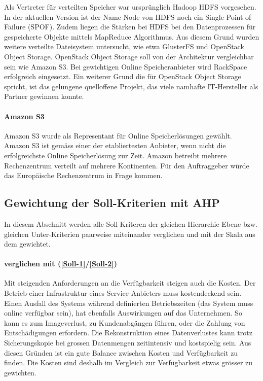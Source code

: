 Als Vertreter für verteilten Speicher war ursprünglich Hadoop HDFS vorgesehen. In der aktuellen Version ist der Name-Node von HDFS noch ein Single Point of Failure (SPOF). Zudem liegen die Stärken bei HDFS bei den Datenprozessen für gespeicherte Objekte mittels MapReduce Algorithmus. Aus diesem Grund wurden weitere verteilte Dateisystem untersucht, wie etwa GlusterFS und OpenStack Object Storage. OpenStack Object Storage soll von der Architektur vergleichbar sein wie Amazon S3. Bei gewichtigen Online Speicheranbieter wird RackSpace erfolgreich eingesetzt. Ein weiterer Grund die für OpenStack Object Storage spricht, ist das gelungene quelloffene Projekt, das viele namhafte IT-Hersteller als Partner gewinnen konnte.

\paragraph{Amazon S3}\label{Al-5}
Amazon S3 wurde als Representant für Online Speicherlösungen gewählt. Amazon S3 ist gemäss  einer der etabliertesten Anbieter, wenn nicht die erfolgreichste Online Speicherlösung zur Zeit. Amazon betreibt mehrere Rechenzentrum verteilt auf mehrere Kontinenten. Für den Auftraggeber würde das Europäische Rechenzentrum in Frage kommen.


\subsection{Gewichtung der Soll-Kriterien mit AHP}

In diesem Abschnitt werden alle Soll-Kriteren der gleichen Hierarchie-Ebene bzw. gleichen Unter-Kriterien paarweise miteinander verglichen und mit der Skala  aus dem  gewichtet.

\paragraph*{ verglichen mit  (\ref{Soll-1}/\ref{Soll-2})} 
Mit steigenden Anforderungen an die Verfügbarkeit steigen auch die Kosten. Der Betrieb einer Infrastruktur eines Service-Anbieters muss kostendeckend sein. Einen Ausfall des Systems während definierten Betriebszeiten (das System muss online verfügbar sein), hat ebenfalls Auswirkungen auf das Unternehmen. So kann es zum Imageverlust, zu Kundenabgängen führen, oder die Zahlung von Entschädigungen erfordern. Die Rekonstruktion eines Datenverlustes kann trotz Sicherungskopie bei grossen Datenmengen zeitintensiv und kostspielig sein. Aus diesen Gründen ist ein gute Balance zwischen Kosten und Verfügbarkeit zu finden. Die Kosten sind deshalb im Vergleich zur Verfügbarkeit etwas grösser zu gewichten.


